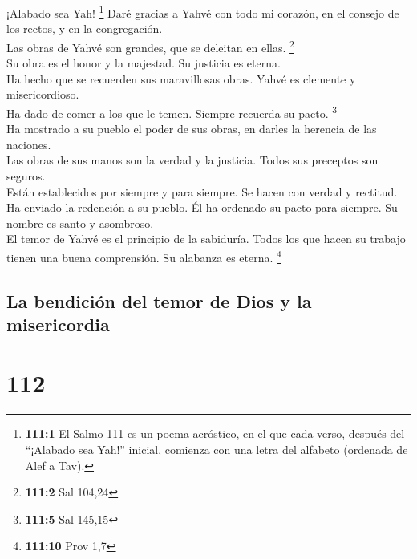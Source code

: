  ¡Alabado sea Yah! \footnote{\textbf{111:1} El Salmo 111
  es un poema acróstico, en el que cada verso, después del ``¡Alabado
  sea Yah!'' inicial, comienza con una letra del alfabeto (ordenada de
  Alef a Tav).} Daré gracias a Yahvé con todo mi corazón, en el consejo
de los rectos, y en la congregación.\\
 Las obras de Yahvé son grandes, que se deleitan en ellas.
\footnote{\textbf{111:2} Sal 104,24}\\
 Su obra es el honor y la majestad. Su justicia es
eterna.\\
 Ha hecho que se recuerden sus maravillosas obras. Yahvé
es clemente y misericordioso.\\
 Ha dado de comer a los que le temen. Siempre recuerda su
pacto. \footnote{\textbf{111:5} Sal 145,15}\\
 Ha mostrado a su pueblo el poder de sus obras, en darles
la herencia de las naciones.\\
 Las obras de sus manos son la verdad y la justicia. Todos
sus preceptos son seguros.\\
 Están establecidos por siempre y para siempre. Se hacen
con verdad y rectitud.\\
 Ha enviado la redención a su pueblo. Él ha ordenado su
pacto para siempre. Su nombre es santo y asombroso.\\
 El temor de Yahvé es el principio de la sabiduría. Todos
los que hacen su trabajo tienen una buena comprensión. Su alabanza es
eterna. \footnote{\textbf{111:10} Prov 1,7}

\hypertarget{la-bendiciuxf3n-del-temor-de-dios-y-la-misericordia}{%
\subsection{La bendición del temor de Dios y la
misericordia}\label{la-bendiciuxf3n-del-temor-de-dios-y-la-misericordia}}

\hypertarget{section-109}{%
\section{112}\label{section-109}}

